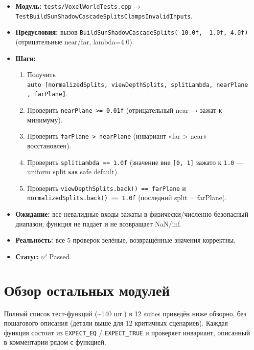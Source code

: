 \documentclass[
  11pt,a4paper,oneside]{article}
\providecommand{\tightlist}{%
  \setlength{\itemsep}{0pt}\setlength{\parskip}{0pt}}
\providecommand{\tightlist}{%
  \setlength{\itemsep}{0pt}\setlength{\parskip}{0pt}}
\begin{document}
\begin{itemize}
\tightlist
\item
  \textbf{Модуль:} \texttt{tests/VoxelWorldTests.cpp} → \texttt{TestBuildSunShadowCascadeSplitsClampsInvalidInputs}.
\item
  \textbf{Предусловия:} вызов \texttt{BuildSunShadowCascadeSplits(-10.0f,\ -1.0f,\ 4.0f)} (отрицательные near/far, lambda=4.0).
\item
  \textbf{Шаги:}

  \begin{enumerate}
  \def\labelenumi{\arabic{enumi}.}
  \tightlist
  \item
    Получить \texttt{auto\ {[}normalizedSplits,\ viewDepthSplits,\ splitLambda,\ nearPlane,\ farPlane{]}}.
  \item
    Проверить \texttt{nearPlane\ \textgreater{}=\ 0.01f} (отрицательный near → зажат к минимуму).
  \item
    Проверить \texttt{farPlane\ \textgreater{}\ nearPlane} (инвариант «far \textgreater{} near» восстановлен).
  \item
    Проверить \texttt{splitLambda\ ==\ 1.0f} (значение вне \texttt{{[}0,\ 1{]}} зажато к \texttt{1.0} --- uniform split как safe default).
  \item
    Проверить \texttt{viewDepthSplits.back()\ ==\ farPlane} и \texttt{normalizedSplits.back()\ ==\ 1.0f} (последний split = farPlane).
  \end{enumerate}
\item
  \textbf{Ожидание:} все невалидные входы зажаты в физически/численно безопасный диапазон; функция не падает и не возвращает NaN/inf.
\item
  \textbf{Реальность:} все 5 проверок зелёные, возвращённые значения корректны.
\item
  \textbf{Статус:} ✅ Passed.
\end{itemize}

\section{Обзор остальных модулей}\label{ux43eux431ux437ux43eux440-ux43eux441ux442ux430ux43bux44cux43dux44bux445-ux43cux43eux434ux443ux43bux435ux439}

Полный список тест-функций (\textasciitilde140 шт.) в 12 suites приведён ниже обзорно, без пошагового описания (детали выше для 12 критичных сценариев). Каждая функция состоит из \texttt{EXPECT\_EQ} / \texttt{EXPECT\_TRUE} и проверяет инвариант, описанный в комментарии рядом с функцией.
\end{document}
